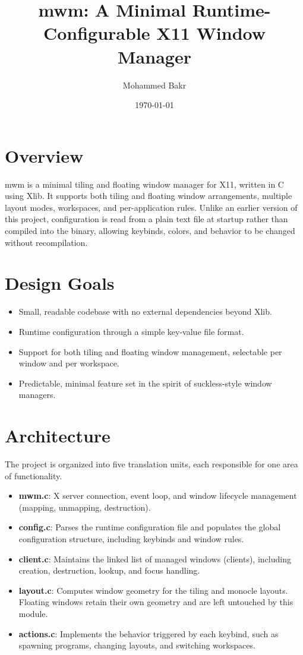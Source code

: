 \documentclass[11pt,a4paper]{article}
\title{mwm: A Minimal Runtime-Configurable X11 Window Manager}
\author{Mohammed Bakr}
\date{\today}
\begin{document}
\maketitle

\section{Overview}

mwm is a minimal tiling and floating window manager for X11, written in C
using Xlib. It supports both tiling and floating window arrangements,
multiple layout modes, workspaces, and per-application rules. Unlike an
earlier version of this project, configuration is read from a plain text
file at startup rather than compiled into the binary, allowing keybinds,
colors, and behavior to be changed without recompilation.

\section{Design Goals}

\begin{itemize}
  \item Small, readable codebase with no external dependencies beyond Xlib.
  \item Runtime configuration through a simple key-value file format.
  \item Support for both tiling and floating window management, selectable
        per window and per workspace.
  \item Predictable, minimal feature set in the spirit of suckless-style
        window managers.
\end{itemize}

\section{Architecture}

The project is organized into five translation units, each responsible for
one area of functionality.

\begin{itemize}
  \item \textbf{mwm.c}: X server connection, event loop, and window
        lifecycle management (mapping, unmapping, destruction).
  \item \textbf{config.c}: Parses the runtime configuration file and
        populates the global configuration structure, including keybinds
        and window rules.
  \item \textbf{client.c}: Maintains the linked list of managed windows
        (clients), including creation, destruction, lookup, and focus
        handling.
  \item \textbf{layout.c}: Computes window geometry for the tiling and
        monocle layouts. Floating windows retain their own geometry and
        are left untouched by this module.
  \item \textbf{actions.c}: Implements the behavior triggered by each
        keybind, such as spawning programs, changing layouts, and
        switching workspaces.
\end{itemize}
\end{document}
